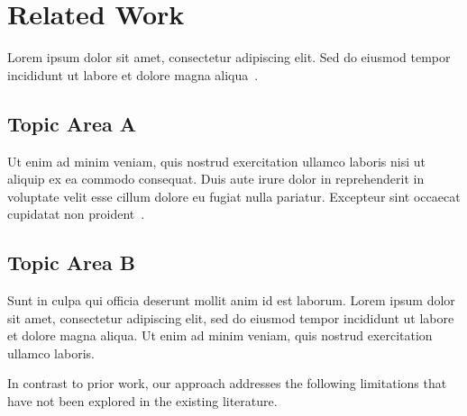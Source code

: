 \section{Related Work}
\label{sec:related}

Lorem ipsum dolor sit amet, consectetur adipiscing elit. Sed do eiusmod tempor
incididunt ut labore et dolore magna aliqua~\cite{placeholder2024}.

\subsection{Topic Area A}

Ut enim ad minim veniam, quis nostrud exercitation ullamco laboris nisi ut
aliquip ex ea commodo consequat. Duis aute irure dolor in reprehenderit in
voluptate velit esse cillum dolore eu fugiat nulla pariatur. Excepteur sint
occaecat cupidatat non proident~\cite{related2023}.

\subsection{Topic Area B}

Sunt in culpa qui officia deserunt mollit anim id est laborum. Lorem ipsum dolor
sit amet, consectetur adipiscing elit, sed do eiusmod tempor incididunt ut labore
et dolore magna aliqua. Ut enim ad minim veniam, quis nostrud exercitation
ullamco laboris.

In contrast to prior work, our approach addresses the following limitations
that have not been explored in the existing literature.
